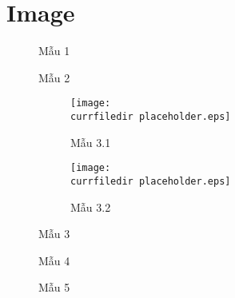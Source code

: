 \clearpage
\section{Image}

\begin{figure}[H]
    \centering{}
    \caption{Mẫu 1}
\end{figure}

\vspace{6pt}

\begin{figure}[H]
    \caption{Mẫu 2}
\end{figure}

\vspace{6pt}

\begin{figure}[H]
    \centering
    \begin{subfigure}[H]{0.5\textwidth}
        \centering
        \texttt{[image: \\currfiledir placeholder.eps]}
        \caption{Mẫu 3.1}
    \end{subfigure}%
    \begin{subfigure}[H]{0.5\textwidth}
        \centering
        \texttt{[image: \\currfiledir placeholder.eps]}
        \caption{Mẫu 3.2}
    \end{subfigure}
    \caption{Mẫu 3}
\end{figure}

\begin{minipage}{0.5\textwidth}
    \begin{figure}[H]
        \centering{}
        \caption{Mẫu 4}
    \end{figure}
\end{minipage}%
\begin{minipage}{0.5\textwidth}
    \begin{figure}[H]
        \centering{}
        \caption{Mẫu 5}
    \end{figure}
\end{minipage}
